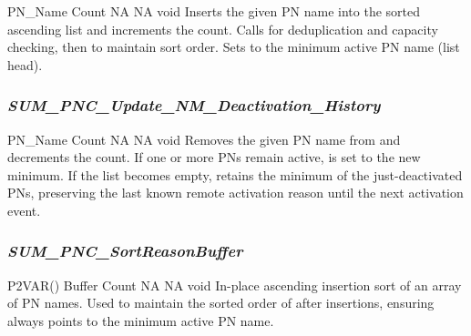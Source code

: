 { \hspace*{1.5in} \vrule \hspace*{0.1in} PN\_Name \newline
  \hspace*{1.5in} \vrule \hspace*{0.1in} Count}
{NA}
{NA}
{void}
{Inserts the given PN name into the sorted ascending list  and increments the count. Calls  for deduplication and capacity checking, then  to maintain sort order. Sets  to the minimum active PN name (list head).}

{}

\subsubsection{\textit{SUM\_PNC\_Update\_NM\_Deactivation\_History}}

{ \hspace*{1.5in} \vrule \hspace*{0.1in} PN\_Name \newline
  \hspace*{1.5in} \vrule \hspace*{0.1in} Count}
{NA}
{NA}
{void}
{Removes the given PN name from  and decrements the count. If one or more PNs remain active,  is set to the new minimum. If the list becomes empty,  retains the minimum of the just-deactivated PNs, preserving the last known remote activation reason until the next activation event.}

{}

\subsubsection{\textit{SUM\_PNC\_SortReasonBuffer}}

{P2VAR() \hspace*{1.1in} \vrule \hspace*{0.1in} Buffer \newline
  \hspace*{1.5in} \vrule \hspace*{0.1in} Count}
{NA}
{NA}
{void}
{In-place ascending insertion sort of an array of PN names. Used to maintain the sorted order of  after insertions, ensuring  always points to the minimum active PN name.}

